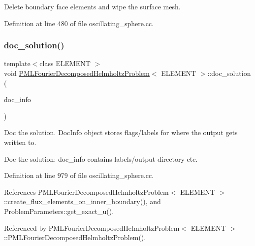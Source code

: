 Delete boundary face elements and wipe the surface mesh. 



Definition at line 480 of file oscillating\+\_\+sphere.\+cc.

\mbox{\label{classPMLFourierDecomposedHelmholtzProblem_afcdfaf86efc75fbea14f6ade9eeb7f9c}} 
\subsubsection{\texorpdfstring{doc\+\_\+solution()}{doc\_solution()}}
{\footnotesize\ttfamily template$<$class E\+L\+E\+M\+E\+NT $>$ \\
void \hyperlink{classPMLFourierDecomposedHelmholtzProblem}{P\+M\+L\+Fourier\+Decomposed\+Helmholtz\+Problem}$<$ E\+L\+E\+M\+E\+NT $>$\+::doc\+\_\+solution (\begin{DoxyParamCaption}\item[{Doc\+Info \&}]{doc\+\_\+info }\end{DoxyParamCaption})}



Doc the solution. Doc\+Info object stores flags/labels for where the output gets written to. 

Doc the solution\+: doc\+\_\+info contains labels/output directory etc. 

Definition at line 979 of file oscillating\+\_\+sphere.\+cc.



References P\+M\+L\+Fourier\+Decomposed\+Helmholtz\+Problem$<$ E\+L\+E\+M\+E\+N\+T $>$\+::create\+\_\+flux\+\_\+elements\+\_\+on\+\_\+inner\+\_\+boundary(), and Problem\+Parameters\+::get\+\_\+exact\+\_\+u().



Referenced by P\+M\+L\+Fourier\+Decomposed\+Helmholtz\+Problem$<$ E\+L\+E\+M\+E\+N\+T $>$\+::\+P\+M\+L\+Fourier\+Decomposed\+Helmholtz\+Problem().

\mbox{\label{classPMLFourierDecomposedHelmholtzProblem_a7d416452acc602776de2072a7c0e1249}} 
